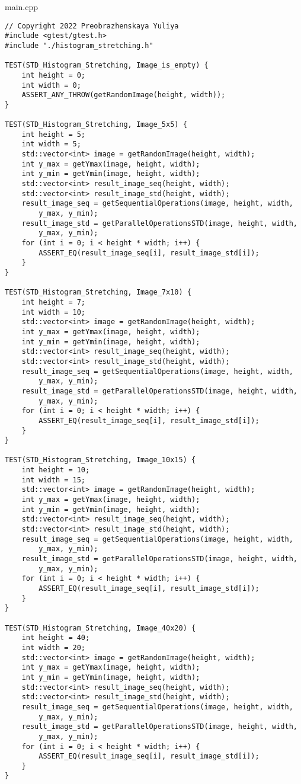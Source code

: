 \documentclass{report}
\begin{document}
main.cpp
\begin{lstlisting}
// Copyright 2022 Preobrazhenskaya Yuliya
#include <gtest/gtest.h>
#include "./histogram_stretching.h"

TEST(STD_Histogram_Stretching, Image_is_empty) {
    int height = 0;
    int width = 0;
    ASSERT_ANY_THROW(getRandomImage(height, width));
}

TEST(STD_Histogram_Stretching, Image_5x5) {
    int height = 5;
    int width = 5;
    std::vector<int> image = getRandomImage(height, width);
    int y_max = getYmax(image, height, width);
    int y_min = getYmin(image, height, width);
    std::vector<int> result_image_seq(height, width);
    std::vector<int> result_image_std(height, width);
    result_image_seq = getSequentialOperations(image, height, width,
        y_max, y_min);
    result_image_std = getParallelOperationsSTD(image, height, width,
        y_max, y_min);
    for (int i = 0; i < height * width; i++) {
        ASSERT_EQ(result_image_seq[i], result_image_std[i]);
    }
}

TEST(STD_Histogram_Stretching, Image_7x10) {
    int height = 7;
    int width = 10;
    std::vector<int> image = getRandomImage(height, width);
    int y_max = getYmax(image, height, width);
    int y_min = getYmin(image, height, width);
    std::vector<int> result_image_seq(height, width);
    std::vector<int> result_image_std(height, width);
    result_image_seq = getSequentialOperations(image, height, width,
        y_max, y_min);
    result_image_std = getParallelOperationsSTD(image, height, width,
        y_max, y_min);
    for (int i = 0; i < height * width; i++) {
        ASSERT_EQ(result_image_seq[i], result_image_std[i]);
    }
}

TEST(STD_Histogram_Stretching, Image_10x15) {
    int height = 10;
    int width = 15;
    std::vector<int> image = getRandomImage(height, width);
    int y_max = getYmax(image, height, width);
    int y_min = getYmin(image, height, width);
    std::vector<int> result_image_seq(height, width);
    std::vector<int> result_image_std(height, width);
    result_image_seq = getSequentialOperations(image, height, width,
        y_max, y_min);
    result_image_std = getParallelOperationsSTD(image, height, width,
        y_max, y_min);
    for (int i = 0; i < height * width; i++) {
        ASSERT_EQ(result_image_seq[i], result_image_std[i]);
    }
}

TEST(STD_Histogram_Stretching, Image_40x20) {
    int height = 40;
    int width = 20;
    std::vector<int> image = getRandomImage(height, width);
    int y_max = getYmax(image, height, width);
    int y_min = getYmin(image, height, width);
    std::vector<int> result_image_seq(height, width);
    std::vector<int> result_image_std(height, width);
    result_image_seq = getSequentialOperations(image, height, width,
        y_max, y_min);
    result_image_std = getParallelOperationsSTD(image, height, width,
        y_max, y_min);
    for (int i = 0; i < height * width; i++) {
        ASSERT_EQ(result_image_seq[i], result_image_std[i]);
    }
}


\end{lstlisting}
\end{document}
